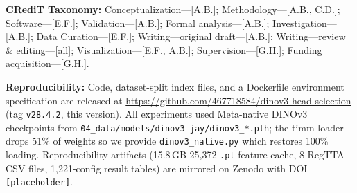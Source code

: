 \documentclass[journal]{IEEEtran}
\begin{document}
\textbf{CRediT Taxonomy:} Conceptualization---[A.B.]; Methodology---[A.B., C.D.]; Software---[E.F.]; Validation---[A.B.]; Formal analysis---[A.B.]; Investigation---[A.B.]; Data Curation---[E.F.]; Writing---original draft---[A.B.]; Writing---review \& editing---[all]; Visualization---[E.F., A.B.]; Supervision---[G.H.]; Funding acquisition---[G.H.].

\textbf{Reproducibility:} Code, dataset-split index files, and a Dockerfile environment specification are released at \url{https://github.com/467718584/dinov3-head-selection} (tag \texttt{v28.4.2}, this version). All experiments used Meta-native DINOv3 checkpoints from \texttt{04\_data/models/dinov3-jay/dinov3\_*.pth}; the timm loader drops 51\% of weights so we provide \texttt{dinov3\_native.py} which restores 100\% loading. Reproducibility artifacts (15.8\,GB 25{,}372 \texttt{.pt} feature cache, 8 RegTTA CSV files, 1{,}221-config result tables) are mirrored on Zenodo with DOI \texttt{[placeholder]}.
\end{document}
